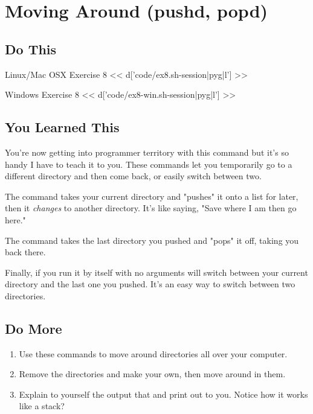 \chapter{Moving Around (pushd, popd)}

\section{Do This}

\begin{code}{Linux/Mac OSX Exercise 8}
<< d['code/ex8.sh-session|pyg|l'] >>
\end{code}

\begin{code}{Windows Exercise 8}
<< d['code/ex8-win.sh-session|pyg|l'] >>
\end{code}

\section{You Learned This}

You're now getting into programmer territory with this command but it's so
handy I have to teach it to you.  These commands let you temporarily go
to a different directory and then come back, or easily switch between
two.

The  command takes your current directory and "pushes" it
onto a list for later, then it \emph{changes} to another directory.  It's
like saying, "Save where I am then go here."

The  command takes the last directory you pushed and "pops"
it off, taking you back there.

Finally,  if you run it by itself with no arguments will
switch between your current directory and the last one you pushed.  It's
an easy way to switch between two directories.

\section{Do More}

\begin{enumerate}
\item Use these commands to move around directories all over your
    computer.
\item Remove the  directories and make your own, then
    move around in them.
\item Explain to yourself the output that  and 
    print out to you.  Notice how it works like a stack?
\end{enumerate}

